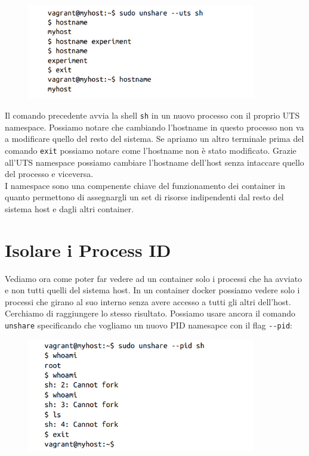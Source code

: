 \begin{figure}[H]
    \centering
    \includegraphics[width=10cm, keepaspectratio]{capitoli/os_security/imgs/hostname2.png}
\end{figure}

Il comando precedente avvia la shell \verb|sh| in un nuovo processo con il proprio
UTS namespace. Possiamo notare che cambiando l'hostname in questo processo
non va a modificare quello del resto del sistema. Se apriamo un altro terminale
prima del comando \verb|exit| possiamo notare come l'hostname non è stato
modificato. Grazie all'UTS namespace possiamo
cambiare l'hostname dell'host senza intaccare quello del processo e viceversa.\\

I namespace sono una compenente chiave del funzionamento dei container in quanto
permettono di assegnargli un set di risorse indipendenti dal resto del sistema host
e dagli altri container.

\section{Isolare i Process ID}

Vediamo ora come poter far vedere ad un container solo i processi che ha avviato e
non tutti quelli del sistema host.
In un container docker possiamo vedere solo i processi che girano al suo interno
senza avere accesso a tutti gli altri dell'host. Cerchiamo di raggiungere lo
stesso risultato. Possiamo usare ancora il comando \verb|unshare| specificando
che vogliamo un nuovo PID namesapce con il flag \verb|--pid|:


\begin{figure}[H]
    \centering
    \includegraphics[width=10cm, keepaspectratio]{capitoli/os_security/imgs/pid1.png}
\end{figure}


